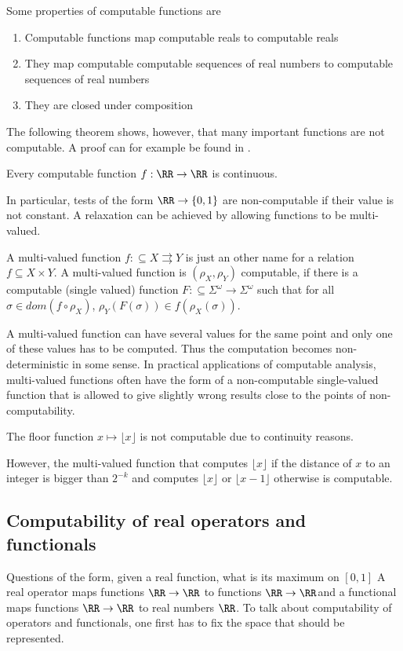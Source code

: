 Some  properties of computable functions are
\begin{enumerate}
  \item Computable functions map computable reals to computable reals
  \item They map computable computable sequences of real numbers to computable
    sequences of real numbers
  \item They are closed under composition
\end{enumerate}

The following theorem shows, however, that many important functions are not computable. 
A proof can for example be found in \cite{Wei}.
\begin{theorem}
  Every computable function $f: \RR \to \RR$ is continuous.
\end{theorem}

In particular, tests of the form $\RR \to \{0,1\}$ are non-computable if their
value is not constant. 
A relaxation can be achieved by allowing functions to be multi-valued.
\begin{definition}
A multi-valued function $f: \subseteq X \rightrightarrows Y$ is just an other name for a relation $f \subseteq X \times Y$.
A multi-valued function is $(\rho_X, \rho_Y)$ computable, if there is a
computable (single valued) function 
$F: \subseteq \Sigma^\omega \to \Sigma^\omega$ such that for all $\sigma \in dom(f \circ \rho_X)$, $\rho_Y(F(\sigma)) \in f(\rho_X(\sigma))$. 
\end{definition}
A multi-valued function can have several values for the same point and only one
of these values has to be computed. 
Thus the computation becomes non-deterministic in some sense.
In practical applications of computable analysis, multi-valued functions often
have the form of a non-computable single-valued function that is allowed to
give slightly wrong results close to the points of non-computability.
\begin{example}
  The floor function $x \mapsto \lfloor x \rfloor$ is not computable due to
  continuity reasons.
  
  However, the multi-valued function that computes $\lfloor x \rfloor$ if the
  distance of $x$ to an integer is bigger than $2^{-k}$ and computes $\lfloor x
  \rfloor$ or $\lfloor x-1 \rfloor$ otherwise is computable.
\end{example}

\subsection{Computability of real operators and functionals}
Questions of the form, given a real function, what is its maximum on $[0,1]$ 
A real operator maps functions $\RR \to \RR$ to functions $\RR \to \RR$and a functional maps functions $\RR \to \RR$ to real numbers $\RR$.
To talk about computability of operators and functionals, one first has to fix
the space that should be represented.


